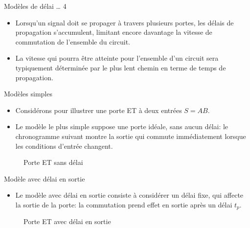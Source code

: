 \documentclass[presentation]{beamer}
\begin{document}
\begin{frame}[label={sec:org7fc5ade}]{Modèles de délai \ldots{} 4}
\begin{itemize}
\item Lorsqu'un signal doit se propager à travers plusieurs portes, les délais de propagation s'accumulent, limitant encore davantage la vitesse de commutation de l'ensemble du circuit.

\item La vitesse qui pourra être atteinte pour l'ensemble d'un circuit sera typiquement déterminée par le plus lent chemin en terme de temps de propagation.
\end{itemize}
\end{frame}

\begin{frame}[label={sec:org937b686}]{Modèles simples}
\begin{itemize}
\item Considérons pour illustrer une porte ET à deux entrées \(S = A B\).

\item Le modèle le plus simple suppose une porte idéale, sans aucun délai: le chronogramme suivant montre la sortie qui commute immédiatement lorsque les conditions d'entrée changent.
\end{itemize}

\begin{figure}[htbp]
\centering

\caption{\label{fig:orge27bd8e}Porte ET sans délai}
\end{figure}
\end{frame}

\begin{frame}[label={sec:orga6a8538}]{Modèle avec délai en sortie}
\begin{itemize}
\item Le modèle avec délai en sortie consiste à considérer un délai fixe, qui affecte la sortie de la porte: la commutation prend effet en sortie après un délai \(t_p\).
\end{itemize}


\begin{figure}[htbp]
\centering

\caption{\label{fig:org974de7a}Porte ET avec délai en sortie}
\end{figure}
\end{frame}
\end{document}
